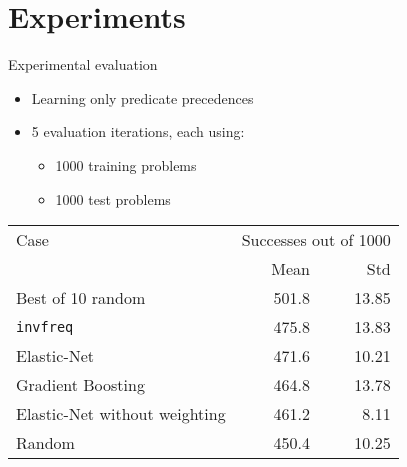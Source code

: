 \documentclass{beamer}
\begin{document}
\section{Experiments}

\begin{frame}{Experimental evaluation}

\begin{itemize}
	\item Learning only predicate precedences
	\item 5 evaluation iterations, each using:
	\begin{itemize}
		\item 1000 training problems
		\item 1000 test problems
	\end{itemize}
\end{itemize}

\begin{table}
\begin{tabular}{l|rr}
	Case & \multicolumn{2}{c}{Successes out of 1000} \\
	& Mean & Std \\
	\hline
	Best of 10 random & 501.8 & 13.85 \\
	\texttt{invfreq} & 475.8 & 13.83 \\
	Elastic-Net & 471.6 & 10.21 \\
	Gradient Boosting & 464.8 & 13.78 \\
	Elastic-Net without weighting & 461.2 & 8.11 \\
	Random & 450.4 & 10.25 \\
\end{tabular}
\end{table}
\end{frame}
\end{document}
